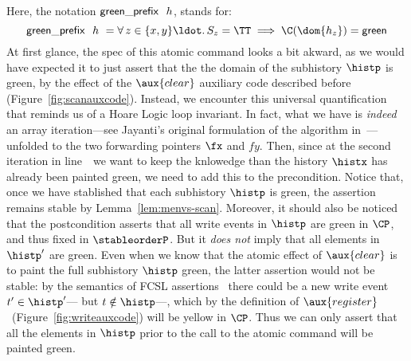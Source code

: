 Here, the notation  ${\mathsf{green\_prefix}}\ \ h$, stands for:
%
\begin{equation}
\label{eq:sss-prefix}
  \greenH\ \ h\ = \forall\, z \in \{x,y\}\ldot.\,
  \spz = \TT \implies \C(\dom{h_z}) = \mathsf{green} 
\end{equation}
%
At first glance, the spec of this atomic command looks a bit akward,
as we would have expected it to just assert that the the domain of the
subhistory $\histp$ is green, by the effect of the $\aux{clear}$
auxiliary code described before
(Figure~\ref{fig:scanauxcode}). Instead, we encounter this universal
quantification that reminds us of a Hoare Logic loop invariant. In
fact, what we have is \emph{indeed} an array iteration---see Jayanti's
original formulation of the algorithm
in~\cite{Jayanti+STOC05}---unfolded to the two forwarding pointers
$\fx$ and $fy$. Then, since at the second iteration in
line~\lineScanClearsY\ we want to keep the knlowedge than the history
$\histx$ has already been painted green, we need to add this to the
precondition. Notice that, once we have stablished that each
subhistory $\histp$ is green, the assertion remains stable by
Lemma~\ref{lem:menvs-scan}. Moreover, it should also be noticed that
the postcondition asserts that all write events in $\histp$ are green
in $\CP$, and thus fixed in $\stableorderP$. But it \emph{does not}
imply that all elements in $\histp'$ are green. Even when we know that
the atomic effect of $\aux{clear}$ is to paint the full subhistory
$\histp$ green, the latter assertion would not be stable: by the
semantics of FCSL assertions~\cite{NanevskiLSD+ESOP14} there could be
a new write event $t' \in \histp'$--- but $t \notin \histp$---, which
by the definition of $\aux{register}$~(Figure~\ref{fig:writeauxcode})
will be {\sf yellow} in $\CP$. Thus we can only assert that all the
elements in $\histp$ prior to the call to the atomic command will be
painted {\sf green}.


